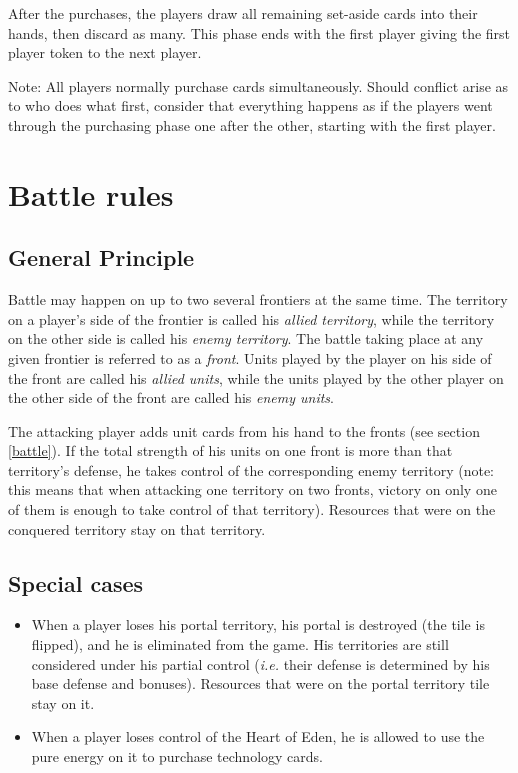 \documentclass[a4paper]{article}
\begin{document}
        After the purchases, the players draw all remaining set-aside cards into their
        hands, then discard as many.        
        This phase ends with the first player giving the first player token
        to the next player.
        
        Note: All players normally purchase cards simultaneously.
        Should conflict arise as to who does what first,
        consider that everything happens as if the players went through
        the purchasing phase one after the other, starting with the first player.


\newpage
\section{Battle rules}
    \label{battle-rules}
    
    \subsection{General Principle}
        Battle may happen on up to two several frontiers at the same time.
        The territory on a player's side of the frontier is called his \textit{allied territory},
        while the territory on the other side is called his \textit{enemy territory}.
        The battle taking place at any given frontier is referred to as a \textit{front}.
        Units played by the player on his side of the front are called his
        \textit{allied units}, while the units played by the other player on the other
        side of the front are called his \textit{enemy units}.
        
        The attacking player adds unit cards from his hand to the fronts
        (see section \ref{battle}).
        If the total strength of his units on one front is more than that territory's
        defense, he takes control of the corresponding enemy territory
        (note: this means that when attacking one territory on two fronts,
        victory on only one of them is enough to take control of that territory).
        Resources that were on the conquered territory stay on that territory.
        
    \subsection{Special cases}
        \begin{itemize}
            \item When a player loses his portal territory,
                     his portal is destroyed (the tile is flipped),
                     and he is eliminated from the game.
                     His territories are still considered under his partial control
                     (\textit{i.e. } their defense is determined by his base defense
                     and bonuses).
                     Resources that were on the portal territory tile stay on it.
            \item When a player loses control of the Heart of Eden,
                     he is allowed to use the pure energy on it to purchase technology cards.
        \end{itemize}
        
\end{document}
